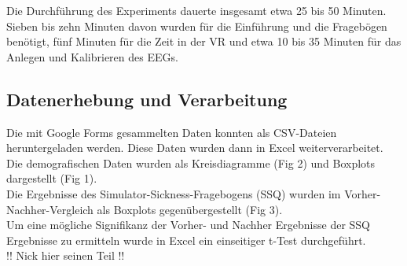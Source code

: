 \documentclass[conference]{IEEEtran}
\begin{document}
Die Durchführung des Experiments dauerte insgesamt etwa 25 bis 50 Minuten. Sieben bis zehn Minuten davon wurden für die Einführung und die Fragebögen benötigt, fünf Minuten für die Zeit in der VR und etwa 10 bis 35 Minuten für das Anlegen und Kalibrieren des EEGs. 

\subsection{Datenerhebung und Verarbeitung}
Die mit Google Forms gesammelten Daten konnten als CSV-Dateien heruntergeladen werden. Diese Daten wurden dann in Excel weiterverarbeitet. Die demografischen Daten wurden als Kreisdiagramme (Fig 2) und Boxplots dargestellt (Fig 1).\\
Die Ergebnisse des Simulator-Sickness-Fragebogens (SSQ) wurden im Vorher-Nachher-Vergleich als Boxplots gegenübergestellt (Fig 3).\\
Um eine mögliche Signifikanz der Vorher- und Nachher Ergebnisse der SSQ Ergebnisse zu ermitteln wurde in Excel ein einseitiger t-Test durchgeführt.\\ 
!! Nick hier seinen Teil !!
\end{document}
